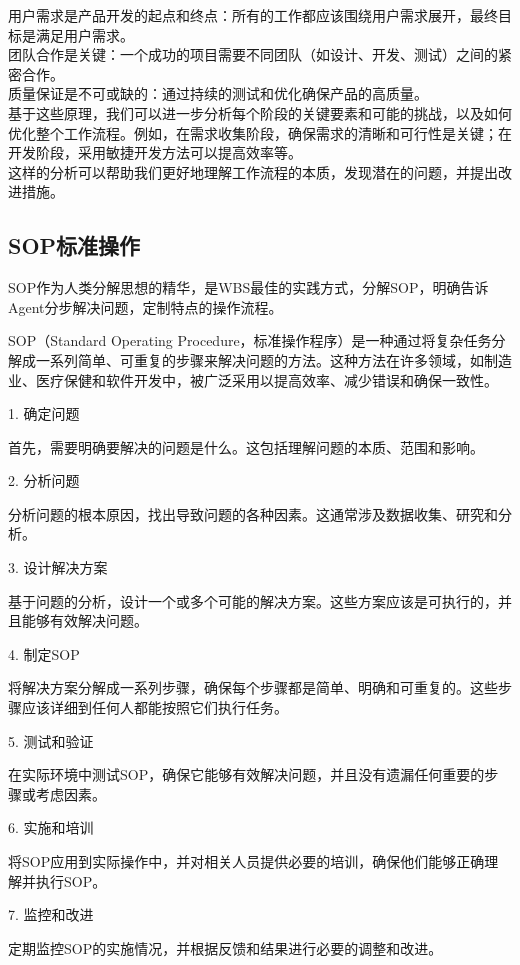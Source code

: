 \documentclass[12pt]{book}
\begin{document}
用户需求是产品开发的起点和终点：所有的工作都应该围绕用户需求展开，最终目标是满足用户需求。\\
团队合作是关键：一个成功的项目需要不同团队（如设计、开发、测试）之间的紧密合作。\\
质量保证是不可或缺的：通过持续的测试和优化确保产品的高质量。\\
基于这些原理，我们可以进一步分析每个阶段的关键要素和可能的挑战，以及如何优化整个工作流程。例如，在需求收集阶段，确保需求的清晰和可行性是关键；在开发阶段，采用敏捷开发方法可以提高效率等。\\

这样的分析可以帮助我们更好地理解工作流程的本质，发现潜在的问题，并提出改进措施。\\


\subsection{SOP标准操作}
SOP作为人类分解思想的精华，是WBS最佳的实践方式，分解SOP，明确告诉Agent分步解决问题，定制特点的操作流程。

SOP（Standard Operating Procedure，标准操作程序）是一种通过将复杂任务分解成一系列简单、可重复的步骤来解决问题的方法。这种方法在许多领域，如制造业、医疗保健和软件开发中，被广泛采用以提高效率、减少错误和确保一致性。

1. 确定问题

首先，需要明确要解决的问题是什么。这包括理解问题的本质、范围和影响。

2. 分析问题

分析问题的根本原因，找出导致问题的各种因素。这通常涉及数据收集、研究和分析。

3. 设计解决方案

基于问题的分析，设计一个或多个可能的解决方案。这些方案应该是可执行的，并且能够有效解决问题。

4. 制定SOP

将解决方案分解成一系列步骤，确保每个步骤都是简单、明确和可重复的。这些步骤应该详细到任何人都能按照它们执行任务。

5. 测试和验证

在实际环境中测试SOP，确保它能够有效解决问题，并且没有遗漏任何重要的步骤或考虑因素。

6. 实施和培训

将SOP应用到实际操作中，并对相关人员提供必要的培训，确保他们能够正确理解并执行SOP。

7. 监控和改进

定期监控SOP的实施情况，并根据反馈和结果进行必要的调整和改进。
\end{document}
